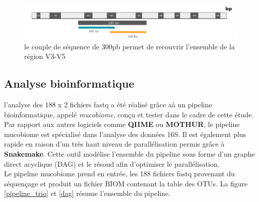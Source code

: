 \documentclass[12pt,a4paper]{article}
\begin{document}
\begin{figure}[ht]
\begin{center}
\includegraphics[scale=0.6]{img/illumina.png}\hfill
\end{center}
\caption{le couple de séquence de 300pb permet de recouvrir l'ensemble de la région V3-V5}
\label{illumina}
\end{figure}


\subsection{Analyse bioinformatique}

l’analyse des 188 x 2 fichiers fastq a été réalisé grâce aà un pipeline bioinformatique, appelé \textit{mucobiome}, conçu et tester dans le cadre de cette étude. Par rapport aux autres logiciels comme \textbf{QIIME} ou \textbf{MOTHUR}, le pipeline mucobiome est spécialisé dans l’analyse des données 16S. Il est également plus rapide en raison d’un très haut niveau de parallélisation permis grâce à  \textbf{Snakemake}. Cette outil modélise l'ensemble du pipeline sous forme d'un graphe direct acyclique (DAG) et le résoud afin d'optimiser le parallélisation. \\
Le pipeline mucobiome prend en entrée, les 188 fichiers fastq provenant du séquençage et produit un fichier BIOM contenant la table des OTUs. La figure \ref{pipeline_trio} et \ref{dag} résume l'ensemble du pipeline.
\end{document}
